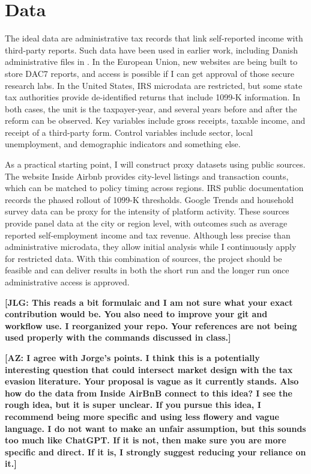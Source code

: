 \documentclass[11pt]{article}
\begin{document}
\section*{Data}
The ideal data are administrative tax records that link self-reported income with third-party reports. Such data have been used in earlier work, including Danish administrative files in \citet{kleven2011unwilling}. In the European Union, new websites are being built to store DAC7 reports, and access is possible if I can get approval of those secure research labs. In the United States, IRS microdata are restricted, but some state tax authorities provide de-identified returns that include 1099-K information. In both cases, the unit is the taxpayer-year, and several years before and after the reform can be observed. Key variables include gross receipts, taxable income, and receipt of a third-party form. Control variables include sector, local unemployment, and demographic indicators and something else.

As a practical starting point, I will construct proxy datasets using public sources. The website Inside Airbnb provides city-level listings and transaction counts, which can be matched to policy timing across regions. IRS public documentation records the phased rollout of 1099-K thresholds. Google Trends and household survey data can be proxy for the intensity of platform activity. These sources provide panel data at the city or region level, with outcomes such as average reported self-employment income and tax revenue. Although less precise than administrative microdata, they allow initial analysis while I continuously apply for restricted data. With this combination of sources, the project should be feasible and can deliver results in both the short run and the longer run once administrative access is approved.

\bigskip 

\noindent \textbf{[JLG: This reads a bit formulaic and I am not sure what your exact contribution would be. You also need to improve your git and workflow use. I reorganized your repo. Your references are not being used properly with the commands discussed in class.]}

\vspace{5em}

\noindent \textbf{[AZ: I agree with Jorge's points. I think this is a potentially interesting question that could intersect market design with the tax evasion literature. Your proposal is vague as it currently stands. Also how do the data from Inside AirBnB connect to this idea? I see the rough idea, but it is super unclear. If you pursue this idea, I recommend being more specific and using less flowery and vague language. I do not want to make an unfair assumption, but this sounds too much like ChatGPT. If it is not, then make sure you are more specific and direct. If it is, I strongly suggest reducing your reliance on it.]}

\newpage


\end{document}
